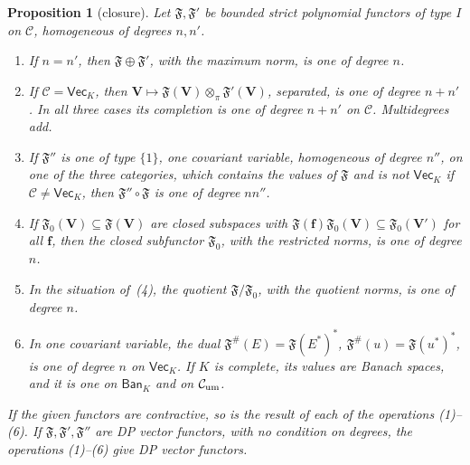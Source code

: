 \documentclass[11pt]{amsart}
\newtheorem{proposition}[theorem]{Proposition}
\theoremstyle{definition}
\theoremstyle{remark}
\numberwithin{equation}{section}
\newcommand{\cC}{\mathcal{C}}
\theoremstyle{plain}
\theoremstyle{definition}
\theoremstyle{plain}
\begin{document}
\begin{proposition}[closure]\label{dp:prop:functor-closure}
Let $\mathfrak F,\mathfrak F'$ be bounded strict polynomial functors of type $I$ on $\cC$, homogeneous of degrees $n,n'$.
\begin{enumerate}
\item If $n=n'$, then $\mathfrak F\oplus\mathfrak F'$, with the maximum norm, is one of degree $n$.
\item If $\cC=\mathsf{Vec}_K$, then $\mathbf V\mapsto\mathfrak F(\mathbf V)\otimes_\pi\mathfrak F'(\mathbf V)$, separated, is one of degree $n+n'$. In all three cases its completion is one of degree $n+n'$ on $\cC$. Multidegrees add.
\item If $\mathfrak F''$ is one of type $\{1\}$, one covariant variable, homogeneous of degree $n''$, on one of the three categories, which contains the values of $\mathfrak F$ and is not $\mathsf{Vec}_K$ if $\cC\ne\mathsf{Vec}_K$, then $\mathfrak F''\circ\mathfrak F$ is one of degree $nn''$.
\item If $\mathfrak F_0(\mathbf V)\subseteq\mathfrak F(\mathbf V)$ are closed subspaces with $\mathfrak F(\mathbf f)\mathfrak F_0(\mathbf V)\subseteq\mathfrak F_0(\mathbf V')$ for all $\mathbf f$, then the closed subfunctor $\mathfrak F_0$, with the restricted norms, is one of degree $n$.
\item In the situation of~(4), the quotient $\mathfrak F/\mathfrak F_0$, with the quotient norms, is one of degree $n$.
\item In one covariant variable, the dual $\mathfrak F^\#(E)=\mathfrak F(E^*)^*$, $\mathfrak F^\#(u)=\mathfrak F(u^*)^*$, is one of degree $n$ on $\mathsf{Vec}_K$. If $K$ is complete, its values are Banach spaces, and it is one on $\mathsf{Ban}_K$ and on $\cC_{\rm um}$.
\end{enumerate}
If the given functors are contractive, so is the result of each of the operations \textup{(1)--(6)}. If $\mathfrak F,\mathfrak F',\mathfrak F''$ are DP vector functors, with no condition on degrees, the operations \textup{(1)--(6)} give DP vector functors.
\end{proposition}
\end{document}
